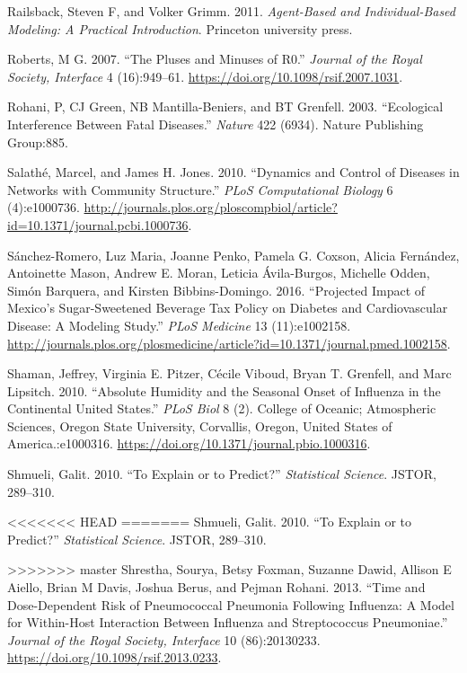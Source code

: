 \documentclass[]{book}
\theoremstyle{definition}
\theoremstyle{definition}
\theoremstyle{definition}
\theoremstyle{remark}
\begin{document}
\leavevmode\hypertarget{ref-railsback11}{}%
Railsback, Steven F, and Volker Grimm. 2011. \emph{Agent-Based and
Individual-Based Modeling: A Practical Introduction}. Princeton
university press.

\leavevmode\hypertarget{ref-roberts07}{}%
Roberts, M G. 2007. ``The Pluses and Minuses of R0.'' \emph{Journal of
the Royal Society, Interface} 4 (16):949--61.
\url{https://doi.org/10.1098/rsif.2007.1031}.

\leavevmode\hypertarget{ref-rohani03}{}%
Rohani, P, CJ Green, NB Mantilla-Beniers, and BT Grenfell. 2003.
``Ecological Interference Between Fatal Diseases.'' \emph{Nature} 422
(6934). Nature Publishing Group:885.

\leavevmode\hypertarget{ref-salathe10}{}%
Salathé, Marcel, and James H. Jones. 2010. ``Dynamics and Control of
Diseases in Networks with Community Structure.'' \emph{PLoS
Computational Biology} 6 (4):e1000736.
\url{http://journals.plos.org/ploscompbiol/article?id=10.1371/journal.pcbi.1000736}.

\leavevmode\hypertarget{ref-sanchez-romero16}{}%
Sánchez-Romero, Luz Maria, Joanne Penko, Pamela G. Coxson, Alicia
Fernández, Antoinette Mason, Andrew E. Moran, Leticia Ávila-Burgos,
Michelle Odden, Simón Barquera, and Kirsten Bibbins-Domingo. 2016.
``Projected Impact of Mexico's Sugar-Sweetened Beverage Tax Policy on
Diabetes and Cardiovascular Disease: A Modeling Study.'' \emph{PLoS
Medicine} 13 (11):e1002158.
\url{http://journals.plos.org/plosmedicine/article?id=10.1371/journal.pmed.1002158}.

\leavevmode\hypertarget{ref-shaman10}{}%
Shaman, Jeffrey, Virginia E. Pitzer, Cécile Viboud, Bryan T. Grenfell,
and Marc Lipsitch. 2010. ``Absolute Humidity and the Seasonal Onset of
Influenza in the Continental United States.'' \emph{PLoS Biol} 8 (2).
College of Oceanic; Atmospheric Sciences, Oregon State University,
Corvallis, Oregon, United States of America.:e1000316.
\url{https://doi.org/10.1371/journal.pbio.1000316}.

\leavevmode\hypertarget{ref-shmueli10}{}%
Shmueli, Galit. 2010. ``To Explain or to Predict?'' \emph{Statistical
Science}. JSTOR, 289--310.

<<<<<<< HEAD
\leavevmode\hypertarget{ref-shrestha13}{}%
=======
\hypertarget{ref-shmueli10}{}
Shmueli, Galit. 2010. ``To Explain or to Predict?'' \emph{Statistical
Science}. JSTOR, 289--310.

\hypertarget{ref-shrestha13}{}
>>>>>>> master
Shrestha, Sourya, Betsy Foxman, Suzanne Dawid, Allison E Aiello, Brian M
Davis, Joshua Berus, and Pejman Rohani. 2013. ``Time and Dose-Dependent
Risk of Pneumococcal Pneumonia Following Influenza: A Model for
Within-Host Interaction Between Influenza and Streptococcus
Pneumoniae.'' \emph{Journal of the Royal Society, Interface} 10
(86):20130233. \url{https://doi.org/10.1098/rsif.2013.0233}.
\end{document}
